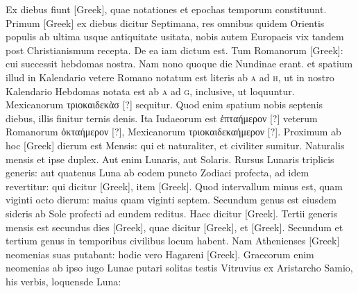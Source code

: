 Ex diebus fiunt \textgreek{[Greek]}, quae notationes et epochas
temporum constituunt.
Primum \textgreek{[Greek]} ex diebus dicitur Septimana,
res omnibus quidem Orientis populis ab ultima usque
antiquitate usitata,
 nobis autem Europaeis vix tandem post Christianismum
recepta.
De ea iam dictum est.
Tum Romanorum \textgreek{[Greek]}: cui
successit hebdomas nostra.
Nam nono quoque die Nundinae erant.
et spatium illud in Kalendario vetere Romano notatum est literis ab
\textsc{a} ad \textsc{h}, ut in nostro Kalendario Hebdomas
 notata est ab \textsc{a} ad \textsc{g}, inclusive,
ut loquuntur.
Mexicanorum \textgreek{τριοκαιδεκὰσ [?]} sequitur.
Quod
enim spatium nobis septenis diebus, illis finitur ternis denis.
Ita Iudaeorum
est \textgreek{ἑπταήμερον [?]} veterum Romanorum \textgreek{ὀκταήμερον [?]},
 Mexicanorum
\textgreek{τριοκαιδεκαήμερον [?]}.
Proximum ab hoc \textgreek{[Greek]} dierum est Mensis:
qui et naturaliter, et civiliter sumitur.
Naturalis mensis et ipse duplex.
Aut enim Lunaris, aut Solaris.
Rursus Lunaris triplicis generis:
aut quatenus Luna ab eodem puncto Zodiaci profecta, ad idem
revertitur: qui dicitur \textgreek{[Greek]},
 item \textgreek{[Greek]}.
Quod intervallum
minus est, quam viginti octo dierum: maius quam viginti septem.
Secundum genus est eiusdem sideris ab Sole profecti ad eundem
reditus.
Haec dicitur \textgreek{[Greek]}.
Tertii generis mensis est secundus
dies \textgreek{[Greek]}, quae dicitur \textgreek{[Greek]},
 et \textgreek{[Greek]}.
Secundum et tertium genus in temporibus civilibus locum habent.
Nam Athenienses \textgreek{[Greek]} neomenias suas putabant:
 hodie vero
Hagareni \textgreek{[Greek]}.
Graecorum enim neomenias ab ipso iugo
Lunae putari solitas testis Vitruvius ex Aristarcho Samio, his verbis,
loquensde Luna:

